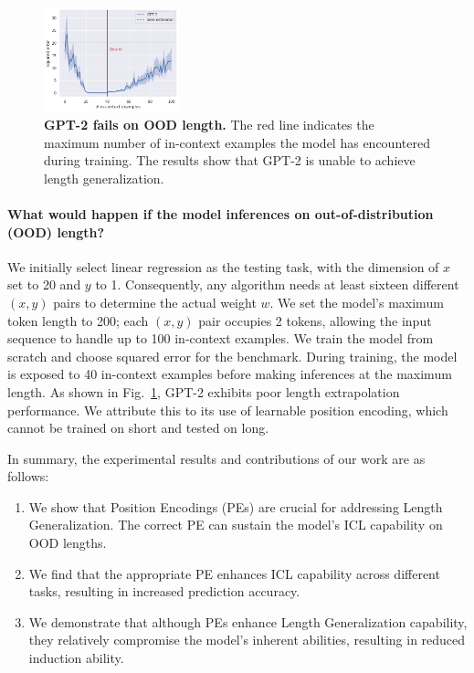 \documentclass[letterpaper]{article} %
\begin{document}
\begin{figure}
    \center
    \includegraphics[width=0.35\textwidth]{AnonymousSubmission/LaTeX/imgs/introduction/gpt-ood.png}
    \caption{
        \small\textbf{GPT-2 fails on OOD length.} The red line indicates the maximum number of in-context examples the model has encountered during training. The results show that GPT-2 is unable to achieve length generalization.
    }
    \label{fig:gpt2}
\end{figure}

\paragraph{What would happen if the model inferences on out-of-distribution (OOD) length?}
We initially select linear regression as the testing task, with the dimension of $x$ set to 20 and $y$ to 1. Consequently, any algorithm needs at least sixteen different $(x, y)$ pairs to determine the actual weight $w$. We set the model's maximum token length to 200; each $(x, y)$ pair occupies 2 tokens, allowing the input sequence to handle up to 100 in-context examples. We train the model from scratch and choose squared error for the benchmark. During training, the model is exposed to 40 in-context examples before making inferences at the maximum length. As shown in Fig.~\ref{fig:gpt2}, GPT-2 exhibits poor length extrapolation performance. We attribute this to its use of learnable position encoding, which cannot be trained on short and tested on long.

In summary, the experimental results and contributions of our work are as follows: 
\begin{enumerate}
    \item We show that Position Encodings (PEs) are crucial for addressing Length Generalization. The correct PE can sustain the model's ICL capability on OOD lengths.
    \item We find that the appropriate PE enhances ICL capability across different tasks, resulting in increased prediction accuracy.
    \item We demonstrate that although PEs enhance Length Generalization capability, they relatively compromise the model's inherent abilities, resulting in reduced induction ability.
\end{enumerate}
\end{document}
